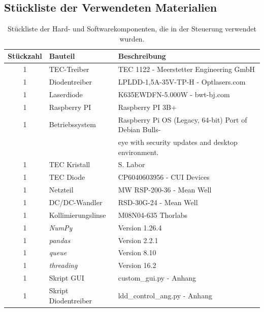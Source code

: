 \begin{appendix}
{{\subsection{Stückliste der Verwendeten Materialien}
\begin{table}[H]
    \centering
    \begin{tabular}{c|l|l}
        Stückzahl& \textbf{Bauteil}&       \textbf{Beschreibung}\\
        \hline
        1&          TEC-Treiber&           TEC 1122 - Meerstetter Engineering GmbH\\
        1&          Diodentreiber&         LPLDD-1,5A-35V-TP-H - Optlasers.com\\
        1&          Laserdiode&            K635EWDFN-5.000W - bwt-bj.com\\
        1&          Raspberry PI&          Raspberry PI 3B+\\
        1&          Betriebssystem&        Raspberry Pi OS (Legacy, 64-bit) Port of Debian Bulls-\\
        &           &                      eye with security updates and desktop environment.\\
        1&          TEC Kristall&          S. Labor\\
        1&          TEC Diode&             CP6040603956 - CUI Devices\\
        1&          Netzteil&              MW RSP-200-36 - Mean Well\\
        1&          DC/DC-Wandler&         RSD-30G-24 - Mean Well\\
        1&          Kollimierungslinse&    M08N04-635 Thorlabs\\
        1&          \textit{NumPy}&        Version 1.26.4\\
        1&          \textit{pandas}&       Version 2.2.1\\
        1&          \textit{queue}&        Version 8.10\\
        1&          \textit{threading}&    Version 16.2\\
        1&          Skript GUI&            custom\_gui.py - Anhang\\
        1&          Skript Diodentreiber&  ldd\_control\_ang.py - Anhang\\
    \end{tabular}
    \caption{Stückliste der Hard- und Softwarekomponenten, die in der Steuerung verwendet wurden.}
    \label{tab:bom}
\end{table}

}}
\end{appendix}
